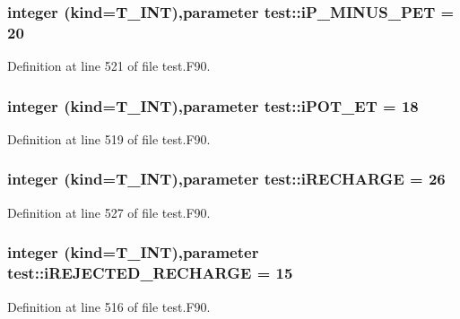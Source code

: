 \hypertarget{namespacetest_a15fc27f3f9430eb7fa5343da57124560}{
\subsubsection[{iP\_\-MINUS\_\-PET}]{\setlength{\rightskip}{0pt plus 5cm}integer (kind={\bf T\_\-INT}),parameter {\bf test::iP\_\-MINUS\_\-PET} = 20}}
\label{namespacetest_a15fc27f3f9430eb7fa5343da57124560}


Definition at line 521 of file test.F90.

\hypertarget{namespacetest_a0b4cecb0049250b0df7313899555765c}{
\subsubsection[{iPOT\_\-ET}]{\setlength{\rightskip}{0pt plus 5cm}integer (kind={\bf T\_\-INT}),parameter {\bf test::iPOT\_\-ET} = 18}}
\label{namespacetest_a0b4cecb0049250b0df7313899555765c}


Definition at line 519 of file test.F90.

\hypertarget{namespacetest_a7cbbcc7ca182caf51d3afe6c583ee71b}{
\subsubsection[{iRECHARGE}]{\setlength{\rightskip}{0pt plus 5cm}integer (kind={\bf T\_\-INT}),parameter {\bf test::iRECHARGE} = 26}}
\label{namespacetest_a7cbbcc7ca182caf51d3afe6c583ee71b}


Definition at line 527 of file test.F90.

\hypertarget{namespacetest_a0e9159063b997894c4a07927cbe42140}{
\subsubsection[{iREJECTED\_\-RECHARGE}]{\setlength{\rightskip}{0pt plus 5cm}integer (kind={\bf T\_\-INT}),parameter {\bf test::iREJECTED\_\-RECHARGE} = 15}}
\label{namespacetest_a0e9159063b997894c4a07927cbe42140}


Definition at line 516 of file test.F90.

